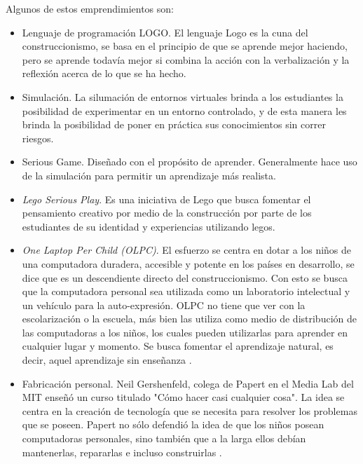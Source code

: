 Algunos de estos emprendimientos son:

\begin{itemize}

\item Lenguaje de programación LOGO. El lenguaje Logo es la cuna del construccionismo, se basa en el principio de que se aprende mejor haciendo, pero se aprende todavía mejor si combina la acción con la verbalización  y la reflexión acerca de lo que se ha hecho.

\item Simulación. La silumación de entornos virtuales brinda a los estudiantes la posibilidad de experimentar en un entorno controlado, y de esta manera les brinda la posibilidad de poner en práctica sus conocimientos sin correr riesgos.

\item Serious Game. Diseñado con el propósito de aprender. Generalmente hace uso de la simulación para permitir un aprendizaje más realista.

\item \emph{Lego Serious Play}. Es una iniciativa de Lego que busca fomentar el pensamiento creativo por medio de la construcción por parte de los estudiantes de su identidad y experiencias utilizando legos. 

\item \emph{One Laptop Per Child (OLPC)}. El esfuerzo se centra en dotar a los niños de una computadora duradera, accesible y potente en los países en desarrollo, se dice que es un descendiente directo del construccionismo. Con esto se busca que la computadora personal sea utilizada como un laboratorio intelectual y un vehículo para la auto-expresión. OLPC no tiene que ver con la escolarización o la escuela, más bien las utiliza como medio de distribución de las computadoras a los niños, los cuales pueden utilizarlas para aprender en cualquier lugar y momento. Se busca fomentar el aprendizaje natural, es decir, aquel aprendizaje sin enseñanza \cite{papertian:const}.


\item Fabricación personal. Neil Gershenfeld, colega de Papert en el Media Lab del MIT enseñó un curso titulado "Cómo hacer casi cualquier cosa". La idea se centra en la creación de tecnología que se necesita para resolver los problemas que se poseen. Papert no sólo defendió la idea de que los niños posean computadoras personales, sino también que a la larga ellos debían mantenerlas, repararlas e incluso construirlas \cite{papertian:const}.

\end{itemize}

